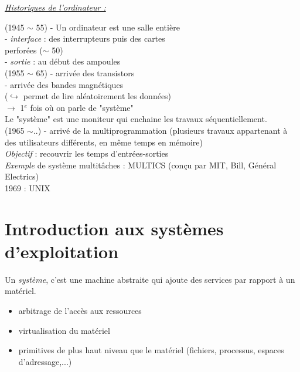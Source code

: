 \documentclass[12pt,a4paper]{report}
\begin{document}
\textit{\underline{Historiques de l'ordinateur :}}


(1945 $\sim$ 55) - Un ordinateur est une salle entière\\
\hspace*{2,8 cm} - \textit{interface} : des interrupteurs puis des cartes\\
\hspace*{2,9 cm}perforées ($\sim$ 50)\\
\hspace*{2,8 cm} - \textit{sortie} : au début des ampoules\\

(1955 $\sim$ 65) - arrivée des transistors\\
\hspace*{2,8 cm} - arrivée des bandes magnétiques\\
\hspace*{2,8 cm} ($\hookrightarrow$ permet de lire aléatoirement les données)\\
\hspace*{2,8 cm} $\rightarrow$ 1$^e$ fois où on parle de "système" \\
\hspace*{1cm} Le "système" est une moniteur qui enchaine les travaux séquentiellement.\\

(1965 $\sim$..) - arrivé de la multiprogrammation (plusieurs travaux appartenant à des utilisateurs différents, en même temps en mémoire)\\
\textit{Objectif} : recouvrir les temps d'entrées-sorties\\

\textit{Exemple} de système multitâches : MULTICS (conçu par MIT, Bill, Général Electrics)\\
\hspace*{2cm} 1969 : UNIX




\chapter{Introduction aux systèmes d'exploitation}
Un \textit{système}, c'est une machine abstraite qui ajoute des services par rapport à un matériel.
\begin{itemize}
\item arbitrage de l'accès aux ressources
\item virtualisation du matériel
\item primitives de plus haut niveau que le matériel (fichiers, processus, espaces d'adressage,...)
\end{itemize}
\end{document}
